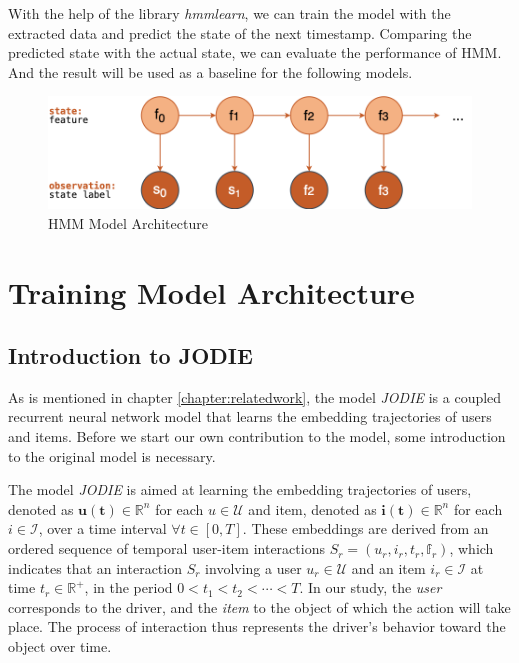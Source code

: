 With the help of the library \textit{hmmlearn}, we can train the model with the extracted data and predict the state of the next timestamp. Comparing the predicted state with the actual state, we can evaluate the performance of HMM. And the result will be used as a baseline for the following models.
\begin{figure}[h]
    \centering
    \includegraphics[width=0.8\linewidth]{figures/04_HMMmodel.png}
    \caption{HMM Model Architecture}
    \label{fig:HMMmodel}
\end{figure}


\section{Training Model Architecture}

\subsection{Introduction to JODIE}
As is mentioned in chapter \ref{chapter:relatedwork}, the model \textit{JODIE} is a coupled recurrent neural network model that learns the embedding trajectories of users and items. Before we start our own contribution to the model, some introduction to the original model is necessary.

The model \textit{JODIE} is aimed at learning the embedding trajectories of users, denoted as $\mathbf{u(t)} \in \mathbb{R} ^n$ for each $u \in \mathcal{U}$ and item, denoted as $\mathbf{i(t)} \in \mathbb{R} ^n$ for each $i \in \mathcal{I} $, over a time interval $\forall t \in [0,T] $. These embeddings are derived from an ordered sequence of temporal user-item interactions $S_r=(u_r,i_r,t_r,\mathbb{f}_r)$, which indicates that an interaction $S_r$ involving a user $u_r \in \mathcal{U} $ and an item $i_r \in \mathcal{I} $ at time $t_r \in \mathbb{R} ^+$, in the period $0 < t_1 < t_2< \cdots  < T$. In our study, the \textit{user} corresponds to the driver, and the \textit{item} to the object of which the action will take place. The process of interaction thus represents the driver’s behavior toward the object over time.

